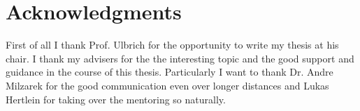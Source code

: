 \section*{Acknowledgments}

First of all I thank Prof. Ulbrich for the opportunity to write my thesis at his chair.
I thank my advisers for the the interesting topic and the good support and guidance in the course of this thesis. Particularly I want to thank Dr. Andre Milzarek for the good communication even over longer distances and Lukas Hertlein for taking over the mentoring so naturally.


